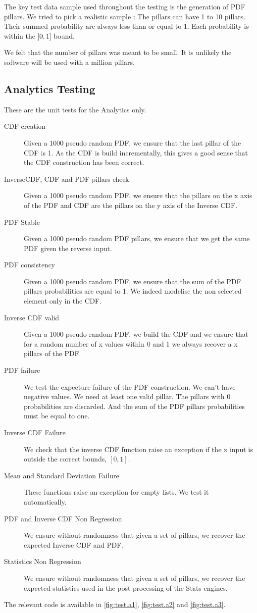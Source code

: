 \documentclass[12pt,a4paper,article]{memoir} %
\begin{document}
The key test data sample used throughout the testing 
is the generation of PDF pillars.
We tried to pick a realistic sample :
The pillars can have 1 to 10 pillars. Their summed probability are always less 
than or equal to 1.  Each probability is within the $]0, 1]$ bound.

We felt that the number of pillars was meant to be small. It is unlikely
the software will be used with a million pillars. 

\subsection{Analytics Testing} 
These are the unit tests for the Analytics only.
\begin{description}
	\item [CDF creation]
		Given a 1000 pseudo random PDF, we ensure 
		that the last pillar of the CDF is 1.
		As the CDF is build incrementally, this gives a good sense that
		the CDF construction has been correct.
	\item [InverseCDF, CDF and PDF pillars check]
		Given a 1000 pseudo random PDF, we ensure that
		the pillars on the x axis of the PDF and CDF are the pillars on the y
		axis of the Inverse CDF.
	\item [PDF Stable]
		Given a 1000 pseudo random PDF pillars, 
		we ensure that we get the same PDF given the reverse input.
	\item [PDF consistency]
		Given a 1000 pseudo random PDF, 
		we ensure that the sum of the PDF pillars probabilities are 
		equal to 1. We indeed modelise the non selected element
		only in the CDF.
	\item [Inverse CDF valid]
		Given a 1000 pseudo random PDF,
		we build the CDF and we ensure that for a random number of
		x values within 0 and 1 we always recover a x pillars of the PDF.
	\item [PDF failure]
		We test the expecture failure of the PDF construction. 
		We can't have negative values. We need at least one valid pillar.
		The pillars with 0 probabilities are discarded.
		And the sum of the PDF pillars probabilities must be 
		equal to one.
	\item [Inverse CDF Failure]
		We check that the inverse CDF function raise an
		exception if the x input is outside the correct bounds, 
		$\left[0, 1\right]$.
	\item [Mean and Standard Deviation Failure]
		These functions raise an exception for empty lists.
		We test it automatically.
	\item [PDF and Inverse CDF Non Regression]
		We ensure without randomness that given a set of pillars,
		we recover the expected Inverse CDF and PDF.
	\item [Statistics Non Regression]
		We ensure without randomness that given a set of pillars,
		we recover the expected statistics used in the post processing
		of the Stats engines.
\end{description}
The relevant code is available in \autoref{fig:test.a1}, \autoref{fig:test.a2}
and \autoref{fig:test.a3}.
\end{document}
